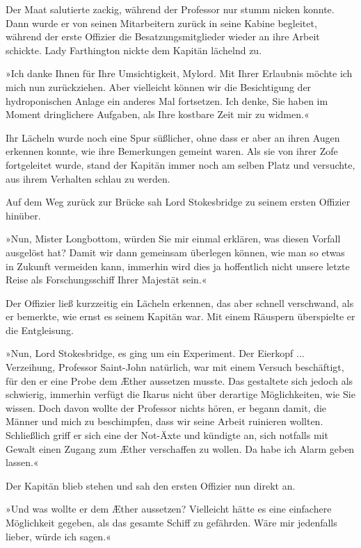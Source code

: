 Der Maat salutierte zackig, während der Professor nur stumm nicken
konnte. Dann wurde er von seinen Mitarbeitern zurück in seine
Kabine begleitet, während der erste Offizier die
Besatzungsmitglieder wieder an ihre Arbeit schickte. Lady
Farthington nickte dem Kapitän lächelnd zu.

»Ich danke Ihnen für Ihre Umsichtigkeit, Mylord. Mit Ihrer
Erlaubnis möchte ich mich nun zurückziehen. Aber vielleicht können
wir die Besichtigung der hydroponischen Anlage ein anderes Mal
fortsetzen. Ich denke, Sie haben im Moment dringlichere Aufgaben,
als Ihre kostbare Zeit mir zu widmen.«

Ihr Lächeln wurde noch eine Spur süßlicher, ohne dass er aber an
ihren Augen erkennen konnte, wie ihre Bemerkungen gemeint waren.
Als sie von ihrer Zofe fortgeleitet wurde, stand der Kapitän immer
noch am selben Platz und versuchte, aus ihrem Verhalten schlau zu
werden.

\bigpar

Auf dem Weg zurück zur Brücke sah Lord Stokesbridge zu seinem
ersten Offizier hinüber.

»Nun, Mister Longbottom, würden Sie mir einmal erklären, was diesen
Vorfall ausgelöst hat? Damit wir dann gemeinsam überlegen können,
wie man so etwas in Zukunft vermeiden kann, immerhin wird dies ja
hoffentlich nicht unsere letzte Reise als Forschungsschiff Ihrer
Majestät sein.«

Der Offizier ließ kurzzeitig ein Lächeln erkennen, das aber schnell
verschwand, als er bemerkte, wie ernst es seinem Kapitän war. Mit
einem Räuspern überspielte er die Entgleisung.

»Nun, Lord Stokesbridge, es ging um ein Experiment. Der Eierkopf
... Verzeihung, Professor Saint-John natürlich, war mit einem
Versuch beschäftigt, für den er eine Probe dem Æther aussetzen
musste. Das gestaltete sich jedoch als schwierig, immerhin verfügt
die Ikarus nicht über derartige Möglichkeiten, wie Sie wissen. Doch
davon wollte der Professor nichts hören, er begann damit, die
Männer und mich zu beschimpfen, dass wir seine Arbeit ruinieren
wollten. Schließlich griff er sich eine der Not-Äxte und kündigte
an, sich notfalls mit Gewalt einen Zugang zum Æther verschaffen zu
wollen. Da habe ich Alarm geben lassen.«

Der Kapitän blieb stehen und sah den ersten Offizier nun direkt
an.

»Und was wollte er dem Æther aussetzen? Vielleicht hätte es eine
einfachere Möglichkeit gegeben, als das gesamte Schiff zu
gefährden. Wäre mir jedenfalls lieber, würde ich sagen.«

